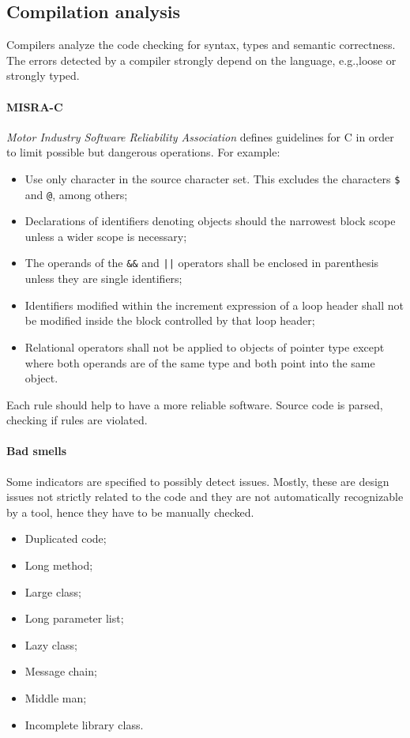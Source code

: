 \subsection{Compilation analysis}
Compilers analyze the code checking for syntax, types and semantic correctness. The errors detected by a compiler strongly depend on the language, e.g.,\@ loose or strongly typed.

\paragraph{MISRA-C}
\emph{Motor Industry Software Reliability Association} defines guidelines for C in order to limit possible but dangerous operations. For example:
\begin{itemize}
\item Use only character in the source character set. This excludes the characters \texttt{\$} and \texttt{@}, among others;
\item Declarations of identifiers denoting objects should the narrowest block scope unless a wider scope is necessary;
\item The operands of the \texttt{\&\&} and \texttt{||} operators shall be enclosed in parenthesis unless they are single identifiers;
\item Identifiers modified within the increment expression of a loop header shall not be modified inside the block controlled by that loop header;
\item Relational operators shall not be applied to objects of pointer type except where both operands are of the same type and both point into the same object.
\end{itemize}
Each rule should help to have a more reliable software. Source code is parsed, checking if rules are violated.

\paragraph{Bad smells}
Some indicators are specified to possibly detect issues. Mostly, these are design issues not strictly related to the code and they are not automatically recognizable by a tool, hence they have to be manually checked.

\begin{multicols}{2}
\begin{itemize}
\item Duplicated code;
\item Long method;
\item Large class;
\item Long parameter list;
\item Lazy class;
\item Message chain;
\item Middle man;
\item Incomplete library class.
\end{itemize}
\end{multicols}

